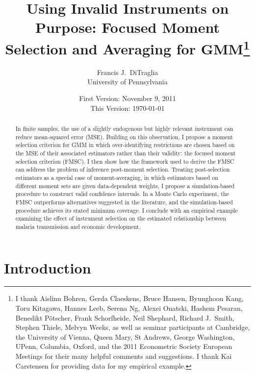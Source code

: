 \documentclass[12pt]{article}
\theoremstyle{definition}
\begin{document}
\title{Using Invalid Instruments on Purpose: Focused Moment Selection and Averaging for GMM\footnote{I thank Aislinn Bohren, Gerda Claeskens, Bruce Hansen, Byunghoon Kang, Toru Kitagawa, Hannes Leeb, Serena Ng, Alexei Onatski, Hashem Pesaran, Benedikt P\"{o}tscher, Frank Schorfheide, Neil Shephard,  Richard J.\ Smith, Stephen Thiele, Melvyn Weeks, as well as seminar participants at Cambridge, the University of Vienna, Queen Mary, St Andrews, George Washington, UPenn, Columbia, Oxford, and the 2011 Econometric Society European Meetings for their many helpful comments and suggestions. I thank Kai Carstensen for providing data for my empirical example.}}

\author{Francis J.\ DiTraglia \\ University of Pennsylvania}

\date{\normalsize First Version: November 9, 2011 \\ This Version: \today}

\maketitle 
\begin{abstract}
In finite samples, the use of a slightly endogenous but highly relevant instrument can reduce mean-squared error (MSE). Building on this observation, I propose a moment selection criterion for GMM in which over-identifying restrictions are chosen based on the MSE of their associated estimators rather than their validity: the focused moment selection criterion (FMSC). I then show how the framework used to derive the FMSC can address the problem of inference post-moment selection. Treating post-selection estimators as a special case of moment-averaging, in which estimators based on different moment sets are given data-dependent weights, I propose a simulation-based procedure to construct valid confidence intervals. In a Monte Carlo experiment, the FMSC outperforms alternatives suggested in the literature, and the simulation-based procedure achieves its stated minimum coverage. I conclude with an empirical example examining the effect of instrument selection on the estimated relationship between malaria transmission and economic development.
\end{abstract}




\section{Introduction}
\end{document}
